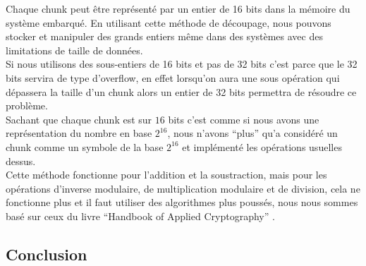 Chaque chunk peut être représenté par un entier de 16 bits dans la mémoire du système embarqué. En utilisant cette méthode de découpage, nous pouvons stocker et manipuler des grands entiers même dans des systèmes avec des limitations de taille de données.\\

Si nous utilisons des sous-entiers de 16 bits et pas de 32 bits c'est parce que le 32 bits servira de type d'overflow, en effet lorsqu'on aura une sous opération qui dépassera la taille d'un chunk alors un entier de 32 bits permettra de résoudre ce problème.\\

Sachant que chaque chunk est sur $16$ bits c'est comme si nous avons une représentation du nombre en base $2^{16}$, nous n'avons ``plus'' qu'a considéré un chunk comme un symbole de la base $2^{16}$ et implémenté les opérations usuelles dessus.\\

Cette méthode fonctionne pour l'addition et la soustraction, mais pour les opérations d'inverse modulaire, de multiplication modulaire et de division, cela ne fonctionne plus et il faut utiliser des algorithmes plus poussés, nous nous sommes basé sur ceux du livre ``Handbook of Applied Cryptography'' \cite{hac:ch14}.
\subsection{Conclusion}
